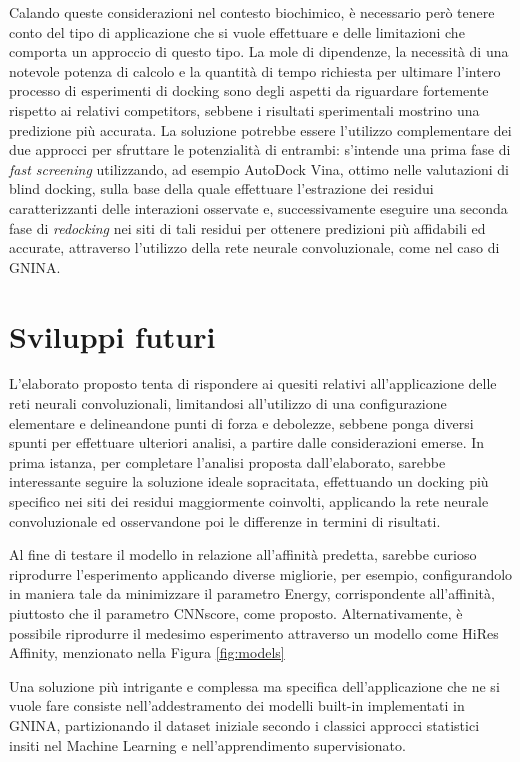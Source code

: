 Calando queste considerazioni nel contesto biochimico, è necessario però tenere conto del tipo di applicazione che si vuole effettuare e delle limitazioni che comporta un approccio di questo tipo. La mole di dipendenze, la necessità di una notevole potenza di calcolo e la quantità di tempo richiesta per ultimare l'intero processo di esperimenti di docking sono degli aspetti da riguardare fortemente rispetto ai relativi competitors, sebbene i risultati sperimentali mostrino una predizione più accurata. 
La soluzione potrebbe essere l'utilizzo complementare dei due approcci per sfruttare le potenzialità di entrambi: s'intende una prima fase di \textit{fast screening} utilizzando, ad esempio AutoDock Vina, ottimo nelle valutazioni di blind docking, sulla base della quale effettuare l'estrazione dei residui caratterizzanti delle interazioni osservate e, successivamente eseguire una seconda fase di \textit{redocking} nei siti di tali residui per ottenere predizioni più affidabili ed accurate, attraverso l'utilizzo della rete neurale convoluzionale, come nel caso di GNINA.
\section*{Sviluppi futuri}
\noindent L'elaborato proposto tenta di rispondere ai quesiti relativi all'applicazione delle reti neurali convoluzionali, limitandosi all'utilizzo di una configurazione elementare e delineandone punti di forza e debolezze, sebbene ponga diversi spunti per effettuare ulteriori analisi, a partire dalle considerazioni emerse. In prima istanza, per completare l'analisi proposta dall'elaborato, sarebbe interessante seguire la soluzione ideale sopracitata, effettuando un docking più specifico nei siti dei residui maggiormente coinvolti, applicando la rete neurale convoluzionale ed osservandone poi le differenze in termini di risultati.

\noindent Al fine di testare il modello in relazione all'affinità predetta, sarebbe curioso riprodurre l'esperimento applicando diverse migliorie, per esempio, configurandolo in maniera tale da minimizzare il parametro Energy, corrispondente all'affinità, piuttosto che il parametro CNNscore, come proposto. Alternativamente, è possibile riprodurre il medesimo esperimento attraverso un modello come HiRes Affinity, menzionato nella Figura \ref{fig:models}

\noindent Una soluzione più intrigante e complessa ma specifica dell'applicazione che ne si vuole fare consiste nell'addestramento dei modelli built-in implementati in GNINA, partizionando il dataset iniziale secondo i classici approcci statistici insiti nel Machine Learning e nell'apprendimento supervisionato. 

